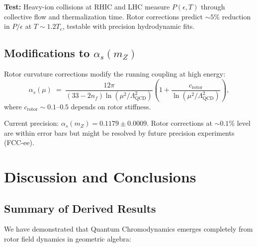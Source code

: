 \documentclass[11pt,a4paper]{article}
\theoremstyle{definition}
\theoremstyle{plain}
\theoremstyle{remark}
\begin{document}
\textbf{Test:} Heavy-ion collisions at RHIC and LHC measure $P(\epsilon,T)$ through collective flow and thermalization time. Rotor corrections predict $\sim 5\%$ reduction in $P/\epsilon$ at $T \sim 1.2 T_c$, testable with precision hydrodynamic fits.

\subsection{Modifications to $\alpha_s(m_Z)$}

Rotor curvature corrections modify the running coupling at high energy:
\begin{equation}
\alpha_s(\mu) \;=\; \frac{12\pi}{(33-2n_f)\ln(\mu^2/\Lambda_{\mathrm{QCD}}^2)}\left(1 + \frac{c_{\mathrm{rotor}}}{\ln(\mu^2/\Lambda_{\mathrm{QCD}}^2)}\right),
\end{equation}
where $c_{\mathrm{rotor}} \sim 0.1$--$0.5$ depends on rotor stiffness.

Current precision: $\alpha_s(m_Z) = 0.1179 \pm 0.0009$. Rotor corrections at $\sim 0.1\%$ level are within error bars but might be resolved by future precision experiments (FCC-ee).

\vspace{1em}

\section{Discussion and Conclusions}
\label{sec:discussion}

\subsection{Summary of Derived Results}

We have demonstrated that Quantum Chromodynamics emerges completely from rotor field dynamics in geometric algebra:
\end{document}

